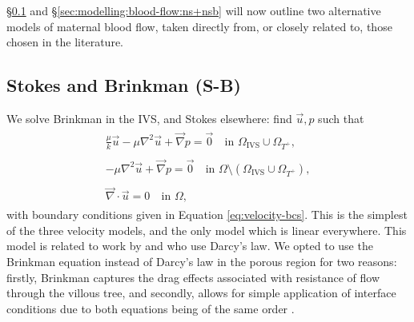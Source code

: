             \S\ref{sec:modelling:blood-flow:s+b} and \S\ref{sec:modelling:blood-flow:ns+nsb} will now outline two alternative models of maternal blood flow, taken directly from, or closely related to, those chosen in the literature.

        \subsection{Stokes and Brinkman (S-B)} \label{sec:modelling:blood-flow:s+b}
            We solve Brinkman in the IVS, and Stokes elsewhere: find $\vec{u}, p$ such that
            \begin{subequations}
                \begin{align}
                    \begin{split}
                        \frac{\mu}{k} \vec{u} -\mu\nabla^2 \vec{u} + \vec{\nabla} p = \vec{0} &~ \text{in } \Omega_{\text{IVS}} \cup \Omega_{T^+},
                    \end{split}\\
                    \begin{split}
                        -\mu\nabla^2 \vec{u} + \vec{\nabla} p = \vec{0} &~ \text{in } \Omega \setminus (\Omega_{\text{IVS}} \cup \Omega_{T^+}),
                    \end{split}\\
                    \begin{split}
                        \vec{\nabla} \cdot \vec{u} = 0 &~ \text{in } \Omega,
                    \end{split}%
                \end{align}%
                \label{eq:s-b}%
            \end{subequations}%
            with boundary conditions given in Equation \ref{eq:velocity-bcs}. This is the simplest of the three velocity models, and the only model which is linear everywhere. This model is related to work by \citeauthor{chernyavskyMathematicalModelIntervillous2010} \cite{chernyavskyMathematicalModelIntervillous2010} and \citeauthor{erianMaternalPlacentalBlood1977} \cite{erianMaternalPlacentalBlood1977} who use Darcy's law. We opted to use the Brinkman equation instead of Darcy's law in the porous region for two reasons: firstly, Brinkman captures the drag effects associated with resistance of flow through the villous tree, and secondly, allows for simple application of interface conditions due to both equations being of the same order \cite{brinkmanCalculationViscousForce1949}. 

